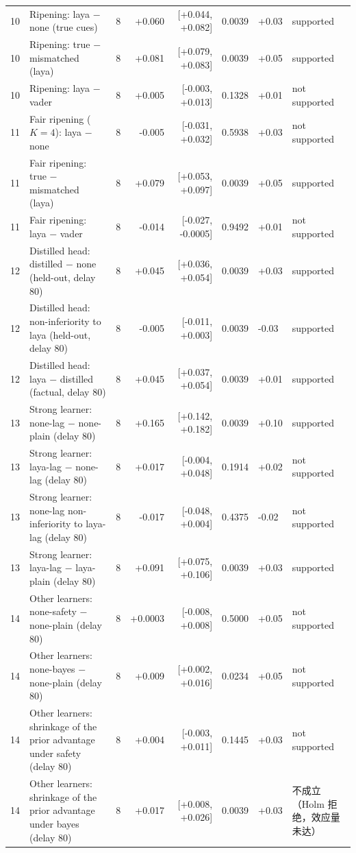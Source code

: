 \begin{table}[t]
{\begin{tabular}{@{}llrrrrll@{}}
10 & Ripening: laya $-$ none (true cues) & 8 & +0.060 & [+0.044, +0.082] & 0.0039 & +0.03 & supported \\
10 & Ripening: true $-$ mismatched (laya) & 8 & +0.081 & [+0.079, +0.083] & 0.0039 & +0.05 & supported \\
10 & Ripening: laya $-$ vader & 8 & +0.005 & [-0.003, +0.013] & 0.1328 & +0.01 & not supported \\
11 & Fair ripening ($K{=}4$): laya $-$ none & 8 & -0.005 & [-0.031, +0.032] & 0.5938 & +0.03 & not supported \\
11 & Fair ripening: true $-$ mismatched (laya) & 8 & +0.079 & [+0.053, +0.097] & 0.0039 & +0.05 & supported \\
11 & Fair ripening: laya $-$ vader & 8 & -0.014 & [-0.027, -0.0005] & 0.9492 & +0.01 & not supported \\
12 & Distilled head: distilled $-$ none (held-out, delay 80) & 8 & +0.045 & [+0.036, +0.054] & 0.0039 & +0.03 & supported \\
12 & Distilled head: non-inferiority to laya (held-out, delay 80) & 8 & -0.005 & [-0.011, +0.003] & 0.0039 & -0.03 & supported \\
12 & Distilled head: laya $-$ distilled (factual, delay 80) & 8 & +0.045 & [+0.037, +0.054] & 0.0039 & +0.01 & supported \\
13 & Strong learner: none-lag $-$ none-plain (delay 80) & 8 & +0.165 & [+0.142, +0.182] & 0.0039 & +0.10 & supported \\
13 & Strong learner: laya-lag $-$ none-lag (delay 80) & 8 & +0.017 & [-0.004, +0.048] & 0.1914 & +0.02 & not supported \\
13 & Strong learner: none-lag non-inferiority to laya-lag (delay 80) & 8 & -0.017 & [-0.048, +0.004] & 0.4375 & -0.02 & not supported \\
13 & Strong learner: laya-lag $-$ laya-plain (delay 80) & 8 & +0.091 & [+0.075, +0.106] & 0.0039 & +0.03 & supported \\
14 & Other learners: none-safety $-$ none-plain (delay 80) & 8 & +0.0003 & [-0.008, +0.008] & 0.5000 & +0.05 & not supported \\
14 & Other learners: none-bayes $-$ none-plain (delay 80) & 8 & +0.009 & [+0.002, +0.016] & 0.0234 & +0.05 & not supported \\
14 & Other learners: shrinkage of the prior advantage under safety (delay 80) & 8 & +0.004 & [-0.003, +0.011] & 0.1445 & +0.03 & not supported \\
14 & Other learners: shrinkage of the prior advantage under bayes (delay 80) & 8 & +0.017 & [+0.008, +0.026] & 0.0039 & +0.03 & 不成立（Holm 拒绝，效应量未达） \\

\end{tabular}}
\end{table}
